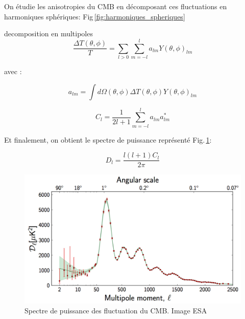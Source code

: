 On étudie les anisotropies du CMB en décomposant ces fluctuations en harmoniques sphériques:
Fig\,\ref{fig:harmoniques_spheriques}

decomposition en multipoles
\begin{equation}
 \frac{\Delta T(\theta,\phi)}{T} = \sum_{l>0} \sum_{m=-l}^l a_{lm} Y(\theta,\phi)_{lm}
\end{equation}

avec : 

\begin{equation}
a_{lm}= \int d\Omega(\theta,\phi) \Delta T (\theta,\phi) Y(\theta,\phi)_{lm}
\end{equation}



\begin{equation}
C_l = \frac{1}{2l+1} \sum_{m=-l}^l a_{lm} a_{lm}^*
\end{equation}


Et finalement, on obtient le spectre de puissance représenté Fig.\,\ref{fig:cmb_power_spectrum}:

\begin{equation}
D_l = \frac{l (l+1) C_l }{2 \pi} 
\end{equation}


\begin{figure}[bth]
        \includegraphics[width=.95\linewidth]{img/01/CMB_power_spectrum.png} 
        \caption{Spectre de puissance des fluctuation du CMB.
        Image ESA}
 		\label{fig:cmb_power_spectrum}
\end{figure}



